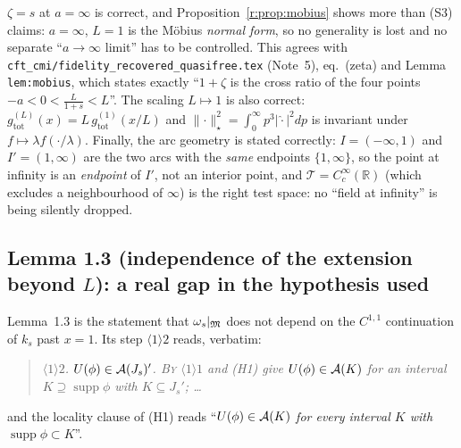\documentclass[11pt]{article}
\newcommand{\norm}[1]{\lVert#1\rVert}
\newcommand{\supp}{\operatorname{supp}}
\newcommand{\gtot}{g_{\mathrm{tot}}}
\begin{document}
\begin{verdictok}
$\zeta=s$ at $a=\infty$ is correct, and Proposition~\ref{r:prop:mobius} shows more than (S3) claims:
$a=\infty$, $L=1$ is the M\"obius \emph{normal form}, so no generality is lost and no separate
``$a\to\infty$ limit'' has to be controlled.  This agrees with
\texttt{cft\_cmi/fidelity\_recovered\_quasifree.tex} (Note~5), eq.~(zeta) and Lemma \texttt{lem:mobius},
which states exactly ``$1+\zeta$ is the cross ratio of the four points $-a<0<\frac L{1+s}<L$''.
The scaling $L\mapsto1$ is also correct: $\gtot^{(L)}(x)=L\,\gtot^{(1)}(x/L)$ and
$\norm\cdot_\star^2=\int_0^\infty p^3|\widehat\cdot|^2dp$ is invariant under $f\mapsto\lambda f(\cdot/\lambda)$.
Finally, the arc geometry is stated correctly: $I=(-\infty,1)$ and $I'=(1,\infty)$ are the two arcs with the
\emph{same} endpoints $\{1,\infty\}$, so the point at infinity is an \emph{endpoint} of $I'$, not an interior
point, and $\mathcal T=C^\infty_c(\mathbb R)$ (which excludes a neighbourhood of $\infty$) is the right test
space: no ``field at infinity'' is being silently dropped.
\end{verdictok}


\subsection{Lemma 1.3 (independence of the extension beyond $L$): a real gap in the hypothesis used}

Lemma~1.3 is the statement that $\omega_s|_{\mathfrak M}$ does not depend on the $C^{1,1}$ continuation of $k_s$
past $x=1$.  Its step $\langle1\rangle2$ reads, verbatim:
\begin{quote}\itshape
$\langle1\rangle2$. $U(\phi)\in\mathcal A(J_s)'$. \textsc{By} $\langle1\rangle1$ and (H1) give $U(\phi)\in\mathcal A(K)$
for an interval $K\supseteq\supp\phi$ with $K\subseteq J_s'$; \dots
\end{quote}
and the locality clause of (H1) reads ``\emph{$U(\phi)\in\mathcal A(K)$ for every interval $K$ with
$\supp\phi\subset K$}''.
\end{document}
